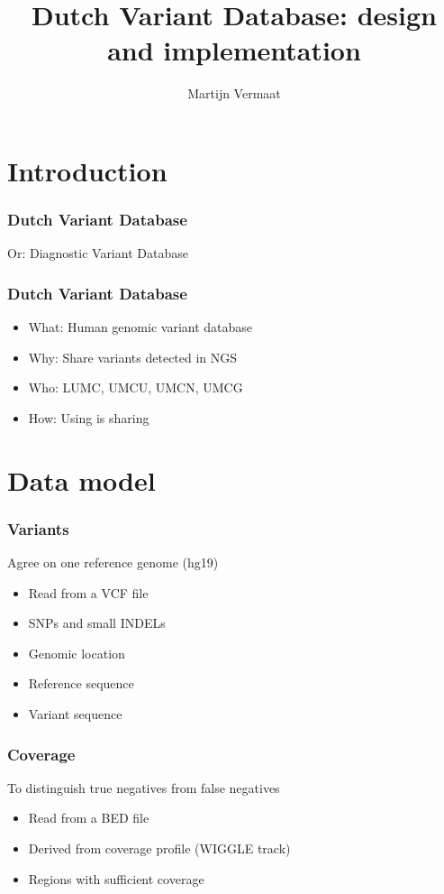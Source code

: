 \documentclass[slidestop]{beamer}
\title{Dutch Variant Database: design and implementation}
\author{Martijn Vermaat}
\begin{document}

\bodytemplate

\section{Introduction}

\begin{frame}
 \frametitle{Dutch Variant Database}
 Or: Diagnostic Variant Database
\end{frame}

\begin{frame}
  \frametitle{Dutch Variant Database}
  \begin{itemize}
    \item What: Human genomic variant database
    \item Why: Share variants detected in NGS
    \item Who: LUMC, UMCU, UMCN, UMCG
    \item How: Using is sharing
  \end{itemize}
\end{frame}

\section{Data model}

\begin{frame}
  \frametitle{Variants}
  Agree on one reference genome (hg19)
  \begin{itemize}
    \item Read from a VCF file
    \item SNPs and small INDELs
    \item Genomic location
    \item Reference sequence
    \item Variant sequence
  \end{itemize}
\end{frame}

\begin{frame}
  \frametitle{Coverage}
  To distinguish true negatives from false negatives
  \begin{itemize}
    \item Read from a BED file
    \item Derived from coverage profile (WIGGLE track)
    \item Regions with sufficient coverage
  \end{itemize}
\end{frame}
\end{document}
